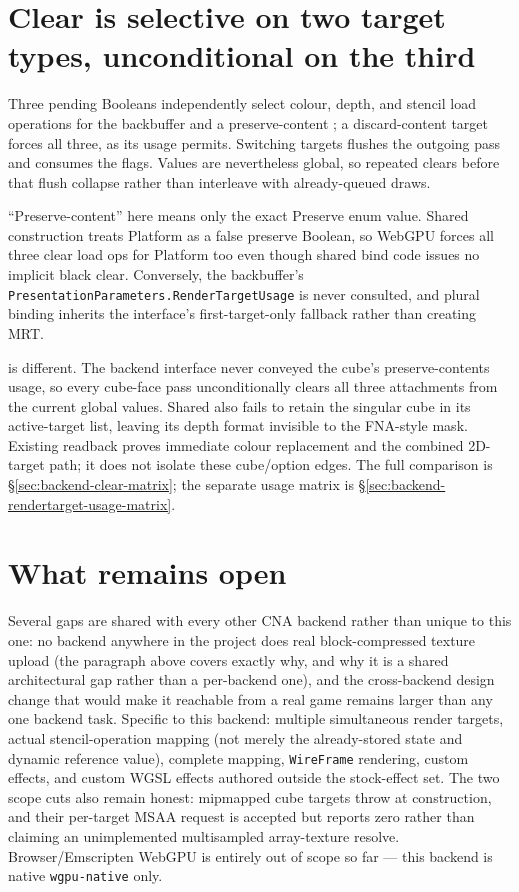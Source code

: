 \section{Clear is selective on two target types, unconditional on the third}

Three pending Booleans independently select colour, depth, and stencil load operations for the
backbuffer and a preserve-content ; a discard-content target forces all
three, as its usage permits. Switching targets flushes the outgoing pass and consumes the
flags. Values are nevertheless global, so repeated clears before that flush collapse rather
than interleave with already-queued draws.

``Preserve-content'' here means only the exact Preserve enum value. Shared construction treats
Platform as a false preserve Boolean, so WebGPU forces all three clear load ops for Platform
too even though shared bind code issues no implicit black clear. Conversely, the backbuffer's
\texttt{Presentation\allowbreak{}Parameters.Render\allowbreak{}Target\allowbreak{}Usage} is
never consulted, and plural binding inherits the interface's first-target-only fallback rather
than creating MRT.

 is different. The backend interface never conveyed the cube's
preserve-contents usage, so every cube-face pass unconditionally clears all three attachments
from the current global values. Shared  also fails to retain the
singular cube in its active-target list, leaving its depth format invisible to the FNA-style
mask. Existing readback proves immediate colour replacement and the combined 2D-target path;
it does not isolate these cube/option edges. The full comparison is
\S\ref{sec:backend-clear-matrix}; the separate usage matrix is
\S\ref{sec:backend-rendertarget-usage-matrix}.

\section{What remains open}

Several gaps are shared with every other CNA backend rather than unique to this one: no
backend anywhere in the project does real block-compressed texture upload (the paragraph above
covers exactly why, and why it is a shared architectural gap rather than a per-backend one),
and the cross-backend design change that would make it reachable from a real game remains
larger than any one backend task. Specific to this backend: multiple simultaneous render
targets, actual stencil-operation mapping (not merely the already-stored state and dynamic
reference value), complete  mapping, \texttt{WireFrame} rendering,
custom  effects, and custom WGSL effects authored outside the stock-effect
set. The two  scope cuts also remain honest: mipmapped cube targets
throw at construction, and their per-target MSAA request is accepted but reports zero rather
than claiming an unimplemented multisampled array-texture resolve. Browser/Emscripten WebGPU is
entirely out of scope so far --- this backend is native \texttt{wgpu-native} only.

